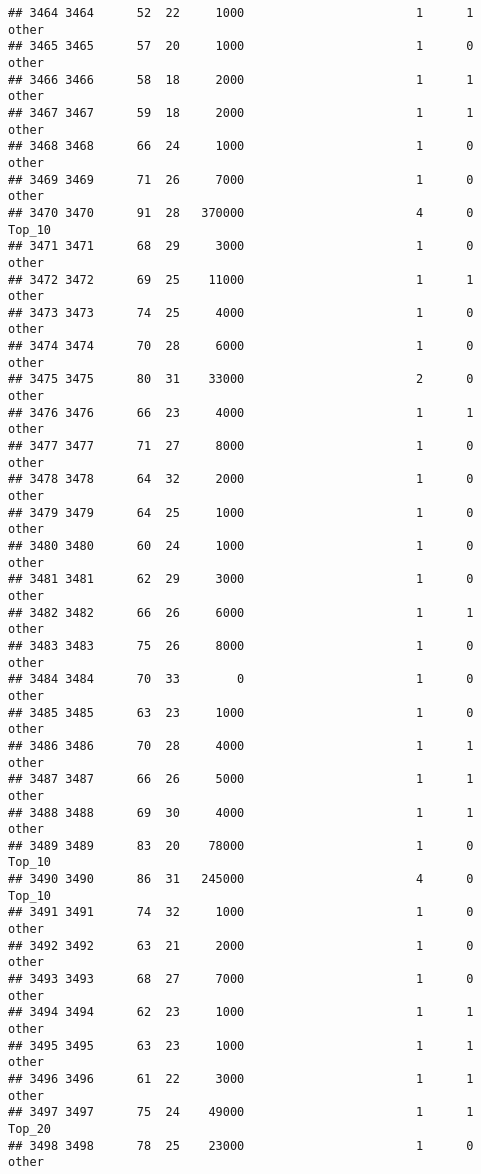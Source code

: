 \documentclass[
]{article}
\begin{document}
\begin{verbatim}
## 3464 3464      52  22     1000                        1      1    other
## 3465 3465      57  20     1000                        1      0    other
## 3466 3466      58  18     2000                        1      1    other
## 3467 3467      59  18     2000                        1      1    other
## 3468 3468      66  24     1000                        1      0    other
## 3469 3469      71  26     7000                        1      0    other
## 3470 3470      91  28   370000                        4      0   Top_10
## 3471 3471      68  29     3000                        1      0    other
## 3472 3472      69  25    11000                        1      1    other
## 3473 3473      74  25     4000                        1      0    other
## 3474 3474      70  28     6000                        1      0    other
## 3475 3475      80  31    33000                        2      0    other
## 3476 3476      66  23     4000                        1      1    other
## 3477 3477      71  27     8000                        1      0    other
## 3478 3478      64  32     2000                        1      0    other
## 3479 3479      64  25     1000                        1      0    other
## 3480 3480      60  24     1000                        1      0    other
## 3481 3481      62  29     3000                        1      0    other
## 3482 3482      66  26     6000                        1      1    other
## 3483 3483      75  26     8000                        1      0    other
## 3484 3484      70  33        0                        1      0    other
## 3485 3485      63  23     1000                        1      0    other
## 3486 3486      70  28     4000                        1      1    other
## 3487 3487      66  26     5000                        1      1    other
## 3488 3488      69  30     4000                        1      1    other
## 3489 3489      83  20    78000                        1      0   Top_10
## 3490 3490      86  31   245000                        4      0   Top_10
## 3491 3491      74  32     1000                        1      0    other
## 3492 3492      63  21     2000                        1      0    other
## 3493 3493      68  27     7000                        1      0    other
## 3494 3494      62  23     1000                        1      1    other
## 3495 3495      63  23     1000                        1      1    other
## 3496 3496      61  22     3000                        1      1    other
## 3497 3497      75  24    49000                        1      1   Top_20
## 3498 3498      78  25    23000                        1      0    other

\end{verbatim}
\end{document}
